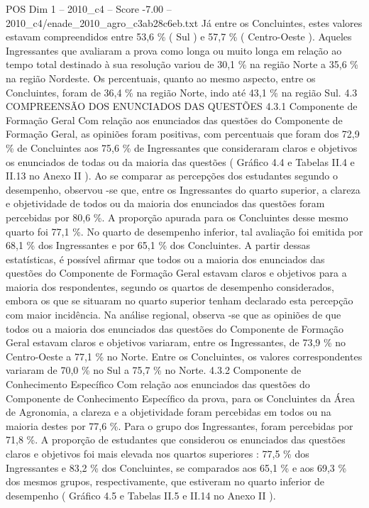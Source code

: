\begin{textsample}{POS Dim 1 – 2010\_c4 – Score -7.00 – 2010\_c4/enade\_2010\_agro\_c3ab28c6eb.txt}
Já entre os Concluintes, estes valores estavam compreendidos entre 53,6 \% ( Sul ) e 57,7 \% ( Centro-Oeste ).
Aqueles Ingressantes que avaliaram a prova como longa ou muito longa em relação ao tempo total destinado à sua resolução variou de 30,1 \% na região Norte a 35,6 \% na região Nordeste.
Os percentuais, quanto ao mesmo aspecto, entre os Concluintes, foram de 36,4 \% na região Norte, indo até 43,1 \% na região Sul. 4.3 COMPREENSÃO DOS ENUNCIADOS DAS QUESTÕES 4.3.1 Componente de Formação Geral Com relação aos enunciados das questões do Componente de Formação Geral, as opiniões foram positivas, com percentuais que foram dos 72,9 \% de Concluintes aos 75,6 \% de Ingressantes que consideraram claros e objetivos os enunciados de todas ou da maioria das questões ( Gráfico 4.4 e Tabelas II.4 e II.13 no Anexo II ).
Ao se comparar as percepções dos estudantes segundo o desempenho, observou -se que, entre os Ingressantes do quarto superior, a clareza e objetividade de todos ou da maioria dos enunciados das questões foram percebidas por 80,6 \%.
A proporção apurada para os Concluintes desse mesmo quarto foi 77,1 \%.
No quarto de desempenho inferior, tal avaliação foi emitida por 68,1 \% dos Ingressantes e por 65,1 \% dos Concluintes.
A partir dessas estatísticas, é possível afirmar que todos ou a maioria dos enunciados das questões do Componente de Formação Geral estavam claros e objetivos para a maioria dos respondentes, segundo os quartos de desempenho considerados, embora os que se situaram no quarto superior tenham declarado esta percepção com maior incidência.
Na análise regional, observa -se que as opiniões de que todos ou a maioria dos enunciados das questões do Componente de Formação Geral estavam claros e objetivos variaram, entre os Ingressantes, de 73,9 \% no Centro-Oeste a 77,1 \% no Norte.
Entre os Concluintes, os valores correspondentes variaram de 70,0 \% no Sul a 75,7 \% no Norte. 4.3.2 Componente de Conhecimento Específico Com relação aos enunciados das questões do Componente de Conhecimento Específico da prova, para os Concluintes da Área de Agronomia, a clareza e a objetividade foram percebidas em todos ou na maioria destes por 77,6 \%.
Para o grupo dos Ingressantes, foram percebidas por 71,8 \%.
A proporção de estudantes que considerou os enunciados das questões claros e objetivos foi mais elevada nos quartos superiores : 77,5 \% dos Ingressantes e 83,2 \% dos Concluintes, se comparados aos 65,1 \% e aos 69,3 \% dos mesmos grupos, respectivamente, que estiveram no quarto inferior de desempenho ( Gráfico 4.5 e Tabelas II.5 e II.14 no Anexo II ).

\end{textsample}
